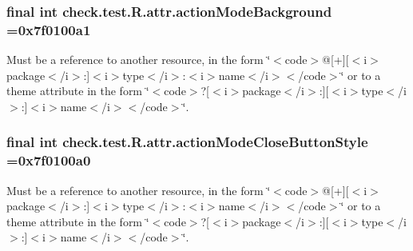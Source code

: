 \subsubsection[{action\+Mode\+Background}]{\setlength{\rightskip}{0pt plus 5cm}final int check.\+test.\+R.\+attr.\+action\+Mode\+Background =0x7f0100a1\hspace{0.3cm}{\ttfamily [static]}}\label{classcheck_1_1test_1_1_r_1_1attr_a4b63c85a0ab6b03ffd464efc207712d8}
Must be a reference to another resource, in the form \char`\"{}$<$code$>$@\mbox{[}+\mbox{]}\mbox{[}$<$i$>$package$<$/i$>$\+:\mbox{]}$<$i$>$type$<$/i$>$\+:$<$i$>$name$<$/i$>$$<$/code$>$\char`\"{} or to a theme attribute in the form \char`\"{}$<$code$>$?\mbox{[}$<$i$>$package$<$/i$>$\+:\mbox{]}\mbox{[}$<$i$>$type$<$/i$>$\+:\mbox{]}$<$i$>$name$<$/i$>$$<$/code$>$\char`\"{}. \hypertarget{classcheck_1_1test_1_1_r_1_1attr_ac21f2ad4b315654a87d0a11cb734236f}{}
\subsubsection[{action\+Mode\+Close\+Button\+Style}]{\setlength{\rightskip}{0pt plus 5cm}final int check.\+test.\+R.\+attr.\+action\+Mode\+Close\+Button\+Style =0x7f0100a0\hspace{0.3cm}{\ttfamily [static]}}\label{classcheck_1_1test_1_1_r_1_1attr_ac21f2ad4b315654a87d0a11cb734236f}
Must be a reference to another resource, in the form \char`\"{}$<$code$>$@\mbox{[}+\mbox{]}\mbox{[}$<$i$>$package$<$/i$>$\+:\mbox{]}$<$i$>$type$<$/i$>$\+:$<$i$>$name$<$/i$>$$<$/code$>$\char`\"{} or to a theme attribute in the form \char`\"{}$<$code$>$?\mbox{[}$<$i$>$package$<$/i$>$\+:\mbox{]}\mbox{[}$<$i$>$type$<$/i$>$\+:\mbox{]}$<$i$>$name$<$/i$>$$<$/code$>$\char`\"{}. \hypertarget{classcheck_1_1test_1_1_r_1_1attr_a3a9c3f760732e5561dc9790d43141bf7}{}
